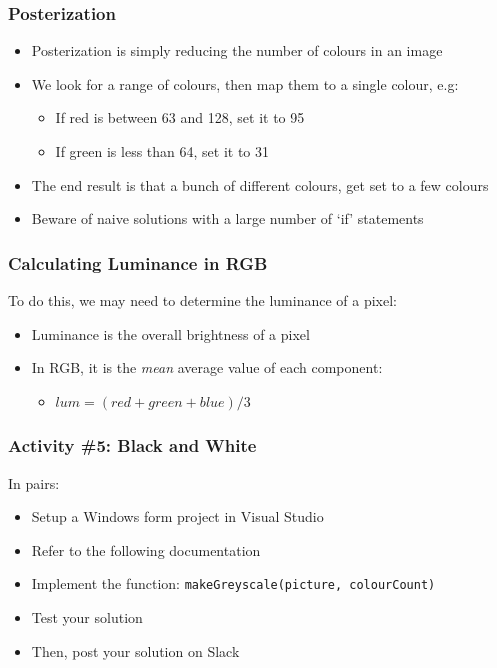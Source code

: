 
\begin{frame}
	\frametitle{Posterization}
	
	\begin{itemize}			
		\item Posterization is simply reducing the number of colours in an image
		\item We look for a range of colours, then map them to a single colour, e.g:
		\begin{itemize}
			\item If red is between 63 and 128, set it to 95
			\item If green is less than 64, set it to 31
		\end{itemize}	
		\item The end result is that a bunch of different colours, get set to a few colours
		\item Beware of naive solutions with a large number of `if' statements
	\end{itemize}
\end{frame}


\begin{frame}
	\frametitle{Calculating Luminance in RGB}
	
	To do this, we may need to determine the luminance of a pixel:
	
	\begin{itemize}		
		\item Luminance is the overall brightness of a pixel
		\item In RGB, it is the \textit{mean} average value of each component:
		\begin{itemize}
			\item $lum = (red + green + blue) / 3$
		\end{itemize}	
	\end{itemize}
\end{frame}



\begin{frame}
	\frametitle{Activity \#5: Black and White}
	
	In pairs:
	
	\vspace{2em}
	
	\begin{itemize}		
		\item Setup a Windows form project in Visual Studio
		\item Refer to the following documentation
		\item Implement the function: \texttt{makeGreyscale(picture, colourCount)}
		\item Test your solution
		\item Then, post your solution on Slack
	\end{itemize}
\end{frame}

